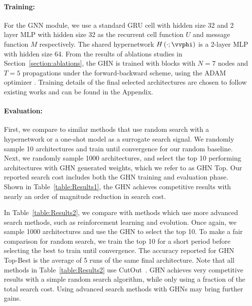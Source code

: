 \documentclass{article} %
\begin{document}
\vspace{-0.25cm}\paragraph{Training:}
For the GNN module, we use a standard GRU cell \citep{cho14gru} with hidden size 32 and 2
layer MLP with hidden size 32 as the recurrent cell function $U$ and message function $M$
respectively. The shared hypernetwork $H \left(\cdot; \vvphi\right)$ is a 2-layer MLP with hidden
size 64. From the results of ablations studies in Section~\ref{section:ablations}, the GHN is
trained with blocks with $N=7$ nodes and $T=5$ propagations under the forward-backward scheme, using
the ADAM optimizer \citep{kingma2015adam}. Training details of the final selected architectures are
chosen to follow existing works and can be found in the Appendix.
\vspace{-0.25cm}\paragraph{Evaluation:}
First, we compare to similar methods that use random search with a  hypernetwork or a one-shot model
as a surrogate search signal. We randomly sample 10 architectures and train until convergence for
our random baseline. Next, we randomly sample 1000 architectures, and select the top 10 performing
architectures with GHN generated weights, which we refer to as GHN Top. Our reported search cost
includes both the GHN training and evaluation phase. Shown in Table~\ref{table:Results1}, the GHN
achieves competitive results with nearly an order of magnitude reduction in search cost.

In Table~\ref{table:Results2}, we compare with methods which use more advanced search methods, such
as reinforcement learning and evolution. Once again, we sample 1000 architectures and use the GHN to
select the top 10. To make a fair comparison for random search, we train the top 10 for a short
period before selecting the best to train until convergence. The accuracy reported for GHN Top-Best
is the average of 5 runs  of the same final architecture. Note that all methods in
Table~\ref{table:Results2} use CutOut~\citep{devriescutout17}. GHN achieves very competitive results
with a simple random search algorithm, while only using a fraction of the total search cost. Using
advanced search methods with GHNs may bring further gains.
\end{document}

